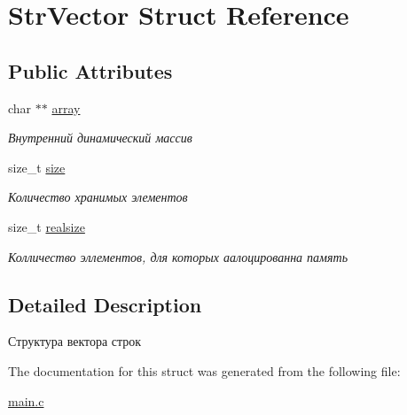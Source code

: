 \hypertarget{structStrVector}{}\section{Str\+Vector Struct Reference}
\label{structStrVector}
\subsection*{Public Attributes}
\begin{DoxyCompactItemize}
\item 
\mbox{\label{structStrVector_af8cec60c7bdca07388eec644a454ec00}} 
char $\ast$$\ast$ \hyperlink{structStrVector_af8cec60c7bdca07388eec644a454ec00}{array}
\begin{DoxyCompactList}\small\item\em Внутренний динамический массив \end{DoxyCompactList}\item 
\mbox{\label{structStrVector_afd68186036a30311d946d5e3153d8282}} 
size\+\_\+t \hyperlink{structStrVector_afd68186036a30311d946d5e3153d8282}{size}
\begin{DoxyCompactList}\small\item\em Количество хранимых элементов \end{DoxyCompactList}\item 
\mbox{\label{structStrVector_a8f6dcb48af4424daa0a30e367a59171f}} 
size\+\_\+t \hyperlink{structStrVector_a8f6dcb48af4424daa0a30e367a59171f}{realsize}
\begin{DoxyCompactList}\small\item\em Колличество эллементов, для которых аалоцированна память \end{DoxyCompactList}\end{DoxyCompactItemize}


\subsection{Detailed Description}
Структура вектора строк 

The documentation for this struct was generated from the following file\+:\begin{DoxyCompactItemize}
\item 
\hyperlink{main_8c}{main.\+c}\end{DoxyCompactItemize}
